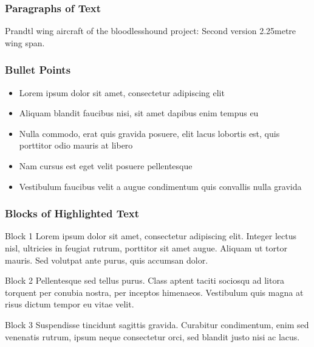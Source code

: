 \documentclass{beamer}
\begin{document}
\begin{frame}
\frametitle{Paragraphs of Text}
Prandtl wing aircraft of the bloodlesshound project:  Second version 2.25metre wing span.



\end{frame}


\begin{frame}
\frametitle{Bullet Points}
\begin{itemize}
\item Lorem ipsum dolor sit amet, consectetur adipiscing elit
\item Aliquam blandit faucibus nisi, sit amet dapibus enim tempus eu
\item Nulla commodo, erat quis gravida posuere, elit lacus lobortis est, quis porttitor odio mauris at libero
\item Nam cursus est eget velit posuere pellentesque
\item Vestibulum faucibus velit a augue condimentum quis convallis nulla gravida
\end{itemize}
\end{frame}


\begin{frame}
\frametitle{Blocks of Highlighted Text}
\begin{block}{Block 1}
Lorem ipsum dolor sit amet, consectetur adipiscing elit. Integer lectus nisl, ultricies in feugiat rutrum, porttitor sit amet augue. Aliquam ut tortor mauris. Sed volutpat ante purus, quis accumsan dolor.
\end{block}

\begin{block}{Block 2}
Pellentesque sed tellus purus. Class aptent taciti sociosqu ad litora torquent per conubia nostra, per inceptos himenaeos. Vestibulum quis magna at risus dictum tempor eu vitae velit.
\end{block}

\begin{block}{Block 3}
Suspendisse tincidunt sagittis gravida. Curabitur condimentum, enim sed venenatis rutrum, ipsum neque consectetur orci, sed blandit justo nisi ac lacus.
\end{block}
\end{frame}

\end{document}
